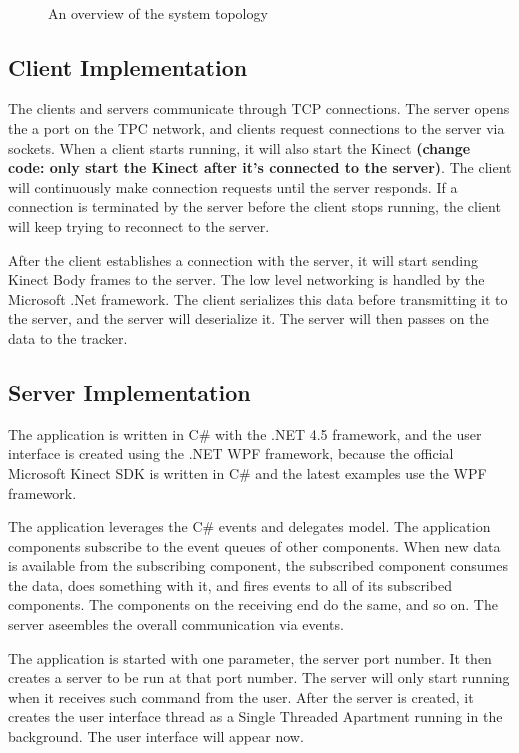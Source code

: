 \documentclass{sigchi}
\begin{document}
\begin{figure}[!h]
  \centering
  
  \caption{An overview of the system topology}~\label{fig:system_diagram}
\end{figure}

\subsection{Client Implementation}

The clients and servers communicate through TCP connections. The server opens the a port on the TPC network, and clients request connections to the server via sockets. When a client starts running, it will also start the Kinect \textbf{(change code: only start the Kinect after it's connected to the server)}. The client will continuously make connection requests until the server responds. If a connection is terminated by the server before the client stops running, the client will keep trying to reconnect to the server.

After the client establishes a connection with the server, it will start sending Kinect Body frames to the server. The low level networking is handled by the Microsoft .Net framework. The client serializes this data before transmitting it to the server, and the server will deserialize it. The server will then passes on the data to the tracker.

\subsection{Server Implementation}

The application is written in C# with the .NET 4.5 framework, and the user interface is created using the .NET WPF framework, because the official Microsoft Kinect SDK is written in C# and the latest examples use the WPF framework. 

The application leverages the C# events and delegates model. The application components subscribe to the event queues of other components. When new data is available from the subscribing component, the subscribed component consumes the data, does something with it, and fires events to all of its subscribed components. The components on the receiving end do the same, and so on. The server aseembles the overall communication via events.

The application is started with one parameter, the server port number. It then creates a server to be run at that port number. The server will only start running when it receives such command from the user. After the server is created, it creates the user interface thread as a Single Threaded Apartment running in the background. The user interface will appear now.
\end{document}
